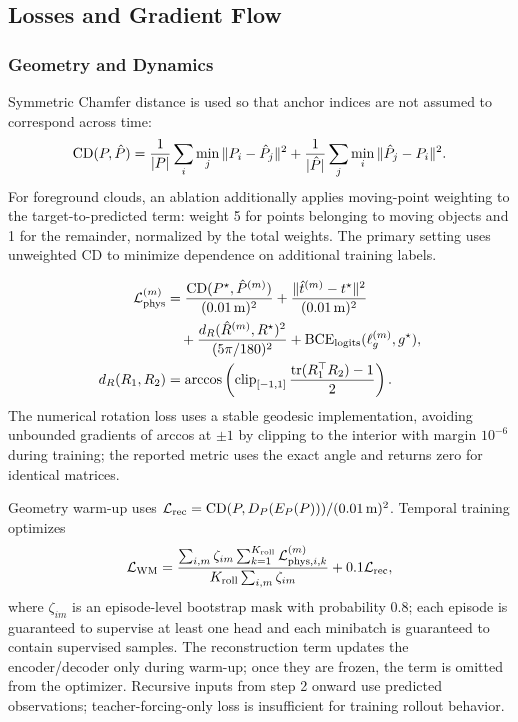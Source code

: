 \documentclass[
  10pt,
]{article}
\begin{document}
\hypertarget{huxe0m-mux1ea5t-muxe1t-vuxe0-luux1ed3ng-gradient}{%
\subsection{Losses and Gradient Flow}\label{huxe0m-mux1ea5t-muxe1t-vuxe0-luux1ed3ng-gradient}}

\hypertarget{huxecnh-hux1ecdc-vuxe0-dynamics}{%
\subsubsection{Geometry and Dynamics}\label{huxecnh-hux1ecdc-vuxe0-dynamics}}

Symmetric Chamfer distance is used so that anchor indices are not assumed to correspond across time:
\begin{equation}\label{eq:cd}
{\rm CD}(P,\hat P)=\frac1{|P|}\sum_i\min_j\|P_i-\hat P_j\|^2+
\frac1{|\hat P|}\sum_j\min_i\|\hat P_j-P_i\|^2.
\end{equation}
For foreground clouds, an ablation additionally applies moving-point weighting to the target-to-predicted term: weight 5 for points belonging to moving objects and 1 for the remainder, normalized by the total weights. The primary setting uses unweighted CD to minimize dependence on additional training labels.

\begin{equation}\label{eq:physloss}
\begin{aligned}
\mathcal L_{\rm phys}^{(m)}
 &=\frac{{\rm CD}(P^\star,\hat P^{(m)})}{(0.01\,{\rm m})^2}
 +\frac{\|\hat t^{(m)}-t^\star\|^2}{(0.01\,{\rm m})^2}\\
 &\quad+\frac{d_R(\hat R^{(m)},R^\star)^2}{(5\pi/180)^2}
 +\operatorname{BCE}_{\rm logits}(\ell_g^{(m)},g^\star),\\
d_R(R_1,R_2)
 &=\arccos\left(\operatorname{clip}_{[-1,1]}\frac{{\rm tr}(R_1^\top R_2)-1}{2}\right).
\end{aligned}
\end{equation}
The numerical rotation loss uses a stable geodesic implementation, avoiding unbounded gradients of arccos at \(\pm1\) by clipping to the interior with margin \(10^{-6}\) during training; the reported metric uses the exact angle and returns zero for identical matrices.

Geometry warm-up uses
\(\mathcal L_{\rm rec}={\rm CD}(P,D_P(E_P(P)))/(0.01\,{\rm m})^2\).
Temporal training optimizes
\begin{equation}\label{eq:wmloss}
\mathcal L_{\rm WM}=
\frac{\sum_{i,m}\zeta_{im}\sum_{k=1}^{K_{\rm roll}}\mathcal L_{{\rm phys},i,k}^{(m)}}
{K_{\rm roll}\sum_{i,m}\zeta_{im}}+
0.1\mathcal L_{\rm rec},
\end{equation}
where \(\zeta_{im}\) is an episode-level bootstrap mask with probability 0.8; each episode is guaranteed to supervise at least one head and each minibatch is guaranteed to contain supervised samples. The reconstruction term updates the encoder/decoder only during warm-up; once they are frozen, the term is omitted from the optimizer. Recursive inputs from step 2 onward use predicted observations; teacher-forcing-only loss is insufficient for training rollout behavior.
\end{document}
